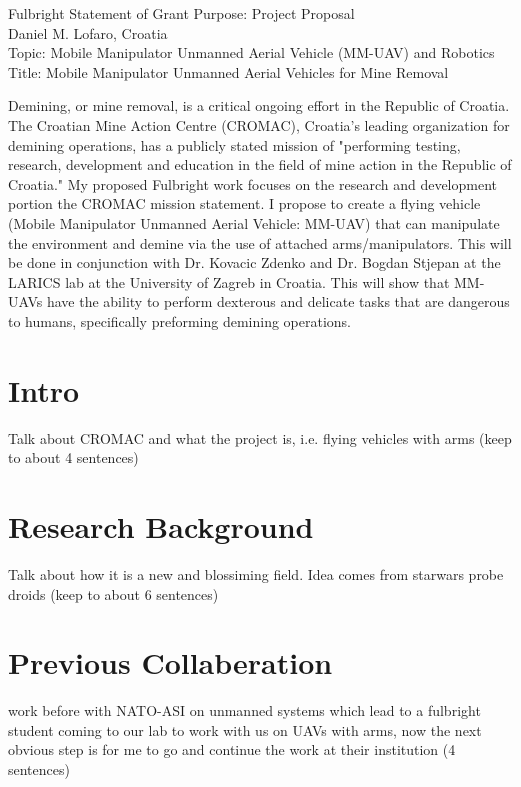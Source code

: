\documentclass[12pt]{article}
\begin{document}
\begin{center}
\Large
Fulbright Statement of Grant Purpose: Project Proposal\\
\large
Daniel M. Lofaro, Croatia\\
Topic: Mobile Manipulator Unmanned Aerial Vehicle (MM-UAV) and Robotics\\
Title: Mobile Manipulator Unmanned Aerial Vehicles for Mine Removal\\

\end{center}

\normalsize
Demining, or mine removal, is a critical ongoing effort in the Republic of Croatia.  The Croatian Mine Action Centre (CROMAC), Croatia's leading organization for demining operations, has a publicly stated mission of "performing testing, research, development and education in the field of mine action in the Republic of Croatia."  My proposed Fulbright work focuses on the research and development portion the CROMAC mission statement.  I propose to create a flying vehicle (Mobile Manipulator Unmanned Aerial Vehicle: MM-UAV) that can manipulate the environment and demine via the use of attached arms/manipulators.  This will be done in conjunction with Dr. Kovacic Zdenko and Dr. Bogdan Stjepan at the LARICS lab at the University of Zagreb in Croatia.  This will show that MM-UAVs have the ability to perform dexterous and delicate tasks that are dangerous to humans, specifically preforming demining operations.

\section{Intro}
Talk about CROMAC and what the project is, i.e. flying vehicles with arms (keep to about 4 sentences)

\section{Research Background}
Talk about how it is a new and blossiming field.  Idea comes from starwars probe droids (keep to about 6 sentences)

\section{Previous Collaberation}
work before with NATO-ASI on unmanned systems which lead to a fulbright student coming to our lab to work with us on UAVs with arms, now the next obvious step is for me to go and continue the work at their institution (4 sentences)
\end{document}
